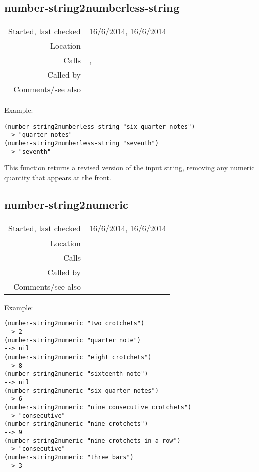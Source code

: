 \subsection*{number-string2numberless-string}\label{fun:number-string2numberless-string}

\vspace{0.3cm}
\begin{tabular}{r|p{8cm}}
Started, last checked & 16/6/2014, 16/6/2014 \\
Location & \nameref{sec:analytic-string-manipulations} \\
Calls & \nameref{fun:min-item}, \nameref{fun:replace-once} \\
Called by & \nameref{fun:consecutive-question2list} \\
Comments/see also & \nameref{fun:number-string2numeric}
\end{tabular}

\vspace{0.5cm}
\noindent Example:
\begin{verbatim}
(number-string2numberless-string "six quarter notes")
--> "quarter notes"
(number-string2numberless-string "seventh")
--> "seventh"
\end{verbatim}

\noindent This function returns a revised version of
the input string, removing any numeric quantity that
appears at the front.


\subsection*{number-string2numeric}\label{fun:number-string2numeric}

\vspace{0.3cm}
\begin{tabular}{r|p{8cm}}
Started, last checked & 16/6/2014, 16/6/2014 \\
Location & \nameref{sec:analytic-string-manipulations} \\
Calls & \nameref{fun:min-item} \\
Called by & \nameref{fun:modify-by-later} \\
Comments/see also & \nameref{fun:number-string2numberless-string}
\end{tabular}

\vspace{0.5cm}
\noindent Example:
\begin{verbatim}
(number-string2numeric "two crotchets")
--> 2
(number-string2numeric "quarter note")
--> nil
(number-string2numeric "eight crotchets")
--> 8
(number-string2numeric "sixteenth note")
--> nil
(number-string2numeric "six quarter notes")
--> 6
(number-string2numeric "nine consecutive crotchets")
--> "consecutive"
(number-string2numeric "nine crotchets")
--> 9
(number-string2numeric "nine crotchets in a row")
--> "consecutive"
(number-string2numeric "three bars")
--> 3
\end{verbatim}

